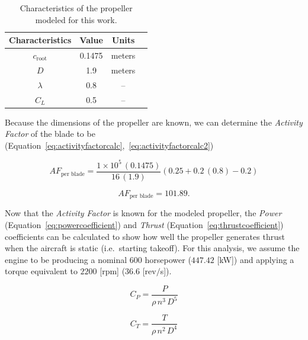 \begin{table}[!ht]\label{tbl:propparams}
    \caption{Characteristics of the propeller modeled for this work.}
    \centering
    \begin{tabular}{cccc}
        \toprule
        \textbf{Characteristics } & \textbf{Value} & \textbf{Units} \\
        \midrule
        \(c_{\textrm{root}}\)     & 0.1475         & meters         \\
        \(D\)                     & 1.9            & meters         \\
        \( \lambda \)             & 0.8            & {--}           \\
        \(C_L\)                   & 0.5            & {--}           \\
        \bottomrule
    \end{tabular}
\end{table}

Because the dimensions of the propeller are known, we can determine the \textit{Activity Factor} of the blade to be (Equation~\ref{eq:activityfactorcalc},~\ref{eq:activityfactorcalc2})

\begin{equation}\label{eq:activityfactorcalc}
    AF_{\textrm{per blade}} = \frac{1 \times 10^5 \, (0.1475)}{16 \, (1.9)} \left(0.25 + 0.2 \, (0.8) - 0.2 \right)
\end{equation}

\begin{equation}\label{eq:activityfactorcalc2}
    AF_{\textrm{per blade}} = 101.89.
\end{equation}

Now that the \textit{Activity Factor} is known for the modeled propeller, the \textit{Power} (Equation~\ref{eq:powercoefficient}) and \textit{Thrust} (Equation~\ref{eq:thrustcoefficient}) coefficients can be calculated to show how well the propeller generates thrust when the aircraft is static (i.e.\ starting takeoff). For this analysis, we assume the engine to be producing a nominal \(600\) horsepower (\(447.42\) [kW]) and applying a torque equivalent to \(2200\) [rpm] (\(36.6\) [rev\(/\)s]).

\begin{equation}\label{eq:powercoefficient}
    C_P = \frac{P}{\rho \, n^3 \, D^5}
\end{equation}

\begin{equation}\label{eq:thrustcoefficient}
    C_T = \frac{T}{\rho \, n^2 \, D^4}
\end{equation}

